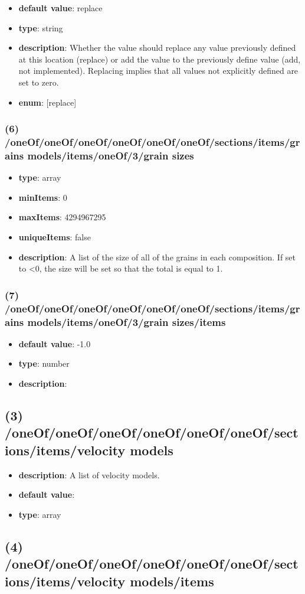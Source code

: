 \begin{itemize}[leftmargin=6em]\item {\bf default value}: replace
\item {\bf type}: string
\item {\bf description}: Whether the value should replace any value previously defined at this location (replace) or add the value to the previously define value (add, not implemented). Replacing implies that all values not explicitly defined are set to zero.
\item {\bf enum}: [replace]\end{itemize}\subsubsection{(6) /oneOf/oneOf/oneOf/oneOf/oneOf/oneOf/sections/items/grains models/items/oneOf/3/grain sizes}
\begin{itemize}[leftmargin=6em]\item {\bf type}: array
\item {\bf minItems}: 0
\item {\bf maxItems}: 4294967295
\item {\bf uniqueItems}: false
\item {\bf description}: A list of the size of all of the grains in each composition. If set to <0, the size will be set so that the total is equal to 1.
\end{itemize}\subsubsection{(7) /oneOf/oneOf/oneOf/oneOf/oneOf/oneOf/sections/items/grains models/items/oneOf/3/grain sizes/items}
\begin{itemize}[leftmargin=7em]\item {\bf default value}: -1.0
\item {\bf type}: number
\item {\bf description}: 
\end{itemize}\subsection{(3) /oneOf/oneOf/oneOf/oneOf/oneOf/oneOf/sections/items/velocity models}
\begin{itemize}[leftmargin=3em]\item {\bf description}: A list of velocity models.
\item {\bf default value}: 
\item {\bf type}: array
\end{itemize}\subsection{(4) /oneOf/oneOf/oneOf/oneOf/oneOf/oneOf/sections/items/velocity models/items}

